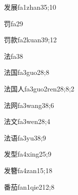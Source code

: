 \begin{verbete}{发展}{fa1zhan3}{5;10}
\end{verbete}

\begin{verbete}{罚}{fa2}{9}
\end{verbete}

\begin{verbete}{罚款}{fa2kuan3}{9;12}
\end{verbete}

\begin{verbete}{法}{fa3}{8}
\end{verbete}

\begin{verbete}{法国}{fa3guo2}{8;8}
\end{verbete}

\begin{verbete}{法国人}{fa3guo2ren2}{8;8;2}
\end{verbete}

\begin{verbete}{法网}{fa3wang3}{8;6}
\end{verbete}

\begin{verbete}{法文}{fa3wen2}{8;4}
\end{verbete}

\begin{verbete}{法语}{fa3yu3}{8;9}
\end{verbete}

\begin{verbete}{发型}{fa4xing2}{5;9}
\end{verbete}

\begin{verbete}{发簪}{fa4zan1}{5;18}
\end{verbete}

\begin{verbete}{番茄}{fan1qie2}{12;8}
\end{verbete}

